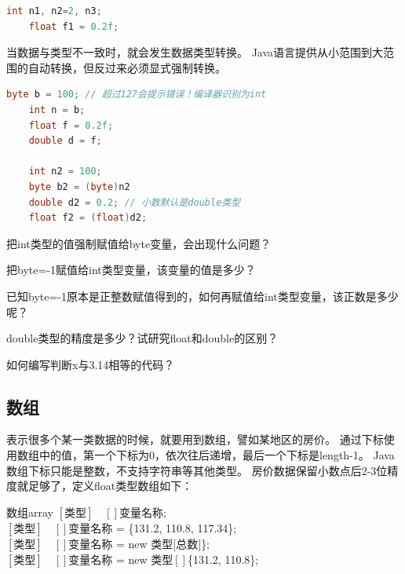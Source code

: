 \begin{lstlisting}[language=java]
	int n1, n2=2, n3;
	float f1 = 0.2f;
\end{lstlisting}


\bigskip
当数据与类型不一致时，就会发生数据类型转换。
Java语言提供从小范围到大范围的自动转换，但反过来必须显式强制转换。

\begin{lstlisting}[language=java]
	byte b = 100; // 超过127会提示错误！编译器识别为int
	int n = b;
	float f = 0.2f;
	double d = f;

	int n2 = 100;
	byte b2 = (byte)n2
	double d2 = 0.2; // 小数默认是double类型
	float f2 = (float)d2;
\end{lstlisting}

\bigskip

\begin{exercise}
	把int类型的值强制赋值给byte变量，会出现什么问题？
\end{exercise}

\begin{exercise}
	把byte=-1赋值给int类型变量，该变量的值是多少？
\end{exercise}

\begin{exercise}
	已知byte=-1原本是正整数赋值得到的，如何再赋值给int类型变量，该正数是多少呢？
\end{exercise}

\begin{exercise}
	double类型的精度是多少？试研究float和double的区别？
\end{exercise}

\begin{exercise}
	如何编写判断x与3.14相等的代码？
\end{exercise}

\subsection{数组}
表示很多个某一类数据的时候，就要用到数组，譬如某地区的房价。
通过下标使用数组中的值，第一个下标为0，依次往后递增，最后一个下标是length-1。
Java数组下标只能是整数，不支持字符串等其他类型。
房价数据保留小数点后2-3位精度就足够了，定义float类型数组如下：

\begin{definition}{数组}{array}
	$[\text{类型}]\quad[]$变量名称;\\
	$[\text{类型}]\quad[]$变量名称 = \{131.2, 110.8, 117.34\};\\
	$[\text{类型}]\quad[]$变量名称 = new 类型$[$总数$]$\};\\
	$[\text{类型}]\quad[]$变量名称 = new 类型$[]$\{131.2, 110.8\};
\end{definition}

